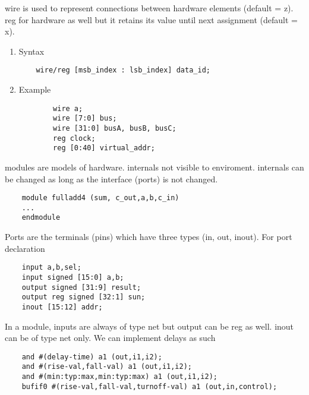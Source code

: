 wire is used to represent connections between hardware elements (default = z).
reg for hardware as well but it retains its value until next assignment (default = x).

\begin{enumerate}
    \item Syntax

          \begin{lstlisting}
    wire/reg [msb_index : lsb_index] data_id;
\end{lstlisting}
    \item Example
          \begin{lstlisting}
        wire a;
        wire [7:0] bus;
        wire [31:0] busA, busB, busC;
        reg clock;
        reg [0:40] virtual_addr;
    \end{lstlisting}
\end{enumerate}

modules are models of hardware. internals not visible to enviroment. internals can be changed as long as the interface (ports) is not changed.
\begin{lstlisting}
    module fulladd4 (sum, c_out,a,b,c_in)
    ... 
    endmodule  
\end{lstlisting}
Ports are the terminals (pins) which have three types (in, out, inout). For port declaration
\begin{lstlisting}
    input a,b,sel;
    input signed [15:0] a,b;
    output signed [31:9] result;
    output reg signed [32:1] sun;
    inout [15:12] addr;
\end{lstlisting}
In a module, inputs are always of type net but output can be reg as well. inout can be of type net only.
We can implement delays as such
\begin{lstlisting}
    and #(delay-time) a1 (out,i1,i2);
    and #(rise-val,fall-val) a1 (out,i1,i2);
    and #(min:typ:max,min:typ:max) a1 (out,i1,i2);
    bufif0 #(rise-val,fall-val,turnoff-val) a1 (out,in,control);
\end{lstlisting}